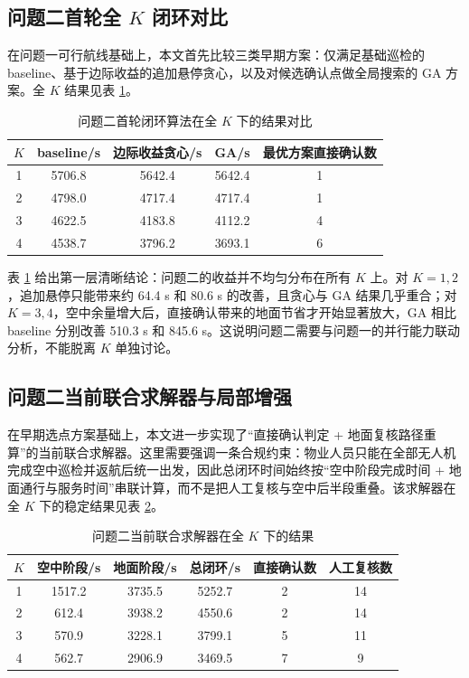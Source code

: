 \documentclass[12pt]{article}
\begin{document}
\subsection{问题二首轮全 $K$ 闭环对比}
在问题一可行航线基础上，本文首先比较三类早期方案：仅满足基础巡检的 baseline、基于边际收益的追加悬停贪心，以及对候选确认点做全局搜索的 GA 方案。全 $K$ 结果见表 \ref{tab:problem2-round1-fullk}。

\begin{table}[H]
\centering
\caption{问题二首轮闭环算法在全 $K$ 下的结果对比}
\label{tab:problem2-round1-fullk}
\begin{tabular}{ccccc}
\toprule
$K$ & baseline/s & 边际收益贪心/s & GA/s & 最优方案直接确认数 \\
\midrule
1 & 5706.8 & 5642.4 & 5642.4 & 1 \\
2 & 4798.0 & 4717.4 & 4717.4 & 1 \\
3 & 4622.5 & 4183.8 & 4112.2 & 4 \\
4 & 4538.7 & 3796.2 & 3693.1 & 6 \\
\bottomrule
\end{tabular}
\end{table}

表 \ref{tab:problem2-round1-fullk} 给出第一层清晰结论：问题二的收益并不均匀分布在所有 $K$ 上。对 $K=1,2$，追加悬停只能带来约 64.4 s 和 80.6 s 的改善，且贪心与 GA 结果几乎重合；对 $K=3,4$，空中余量增大后，直接确认带来的地面节省才开始显著放大，GA 相比 baseline 分别改善 510.3 s 和 845.6 s。这说明问题二需要与问题一的并行能力联动分析，不能脱离 $K$ 单独讨论。

\subsection{问题二当前联合求解器与局部增强}
在早期选点方案基础上，本文进一步实现了“直接确认判定 + 地面复核路径重算”的当前联合求解器。这里需要强调一条合规约束：物业人员只能在全部无人机完成空中巡检并返航后统一出发，因此总闭环时间始终按“空中阶段完成时间 + 地面通行与服务时间”串联计算，而不是把人工复核与空中后半段重叠。该求解器在全 $K$ 下的稳定结果见表 \ref{tab:problem2-joint-fullk}。

\begin{table}[H]
\centering
\caption{问题二当前联合求解器在全 $K$ 下的结果}
\label{tab:problem2-joint-fullk}
\begin{tabular}{cccccc}
\toprule
$K$ & 空中阶段/s & 地面阶段/s & 总闭环/s & 直接确认数 & 人工复核数 \\
\midrule
1 & 1517.2 & 3735.5 & 5252.7 & 2 & 14 \\
2 & 612.4 & 3938.2 & 4550.6 & 2 & 14 \\
3 & 570.9 & 3228.1 & 3799.1 & 5 & 11 \\
4 & 562.7 & 2906.9 & 3469.5 & 7 & 9 \\
\bottomrule
\end{tabular}
\end{table}
\end{document}

